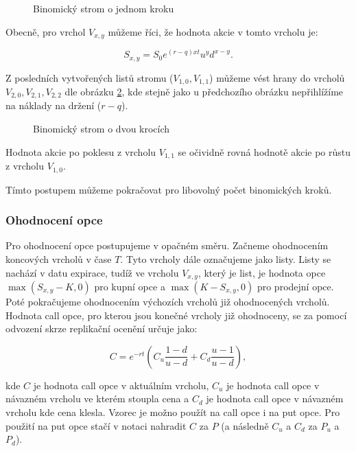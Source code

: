 \documentclass[male,czech,api_bc]{kitheses}
\begin{document}
 \begin{figure}[h]
   \centering
   \caption{Binomický strom o jednom kroku}
   \label{fig:binom_one_step_tree}
 \end{figure}

 Obecně, pro vrchol $V_{x, y}$ můžeme říci, že hodnota akcie v tomto vrcholu je:

 \begin{equation}
   S_{x, y} = S_0 e^{(r-q)xt} u^y d^{x - y}.
 \end{equation}

 Z posledních vytvořených listů stromu ($V_{1, 0}, V_{1, 1}$) můžeme vést hrany do vrcholů $V_{2, 0}, V_{2, 1}, V_{2, 2}$ dle obrázku \ref{fig:binom_two_step_tree}, kde stejně jako u předchozího obrázku nepřihlížíme na náklady na držení ($r-q$).

 \begin{figure}[h]
   \centering
   \caption{Binomický strom o dvou krocích}
   \label{fig:binom_two_step_tree}
 \end{figure}

 Hodnota akcie po poklesu z vrcholu $V_{1, 1}$ se očividně rovná hodnotě akcie po růstu z vrcholu $V_{1, 0}$. 

 Tímto postupem můžeme pokračovat pro libovolný počet binomických kroků. 

 \subsubsection{Ohodnocení opce}

 Pro ohodnocení opce postupujeme v opačném směru. Začneme ohodnocením koncových vrcholů v čase $T$. Tyto vrcholy dále označujeme jako listy. Listy se nachází v datu expirace, tudíž ve vrcholu $V_{x, y}$, který je list, je hodnota opce $\max(S_{x, y} - K, 0)$ pro kupní opce a $\max(K - S_{x, y}, 0)$ pro prodejní opce. Poté pokračujeme ohodnocením výchozích vrcholů již ohodnocených vrcholů. Hodnota call opce, pro kterou jsou konečné vrcholy již ohodnoceny, se za pomocí odvození skrze replikační ocenění určuje jako:

 \begin{equation}
   \label{eq:binom_out}
   C = e^{-rt} \left( C_u \frac{1-d}{u - d} + C_d \frac{u - 1}{u - d} \right),
 \end{equation}

 kde $C$ je hodnota call opce v aktuálním vrcholu, $C_u$ je hodnota call opce v návazném vrcholu ve kterém stoupla cena a $C_d$ je hodnota call opce v návazném vrcholu kde cena klesla.
 Vzorec je možno použít na call opce i na put opce. Pro použití na put opce stačí v notaci nahradit $C$ za $P$ (a následně $C_u$ a $C_d$ za $P_u$ a $P_d$).
\end{document}
